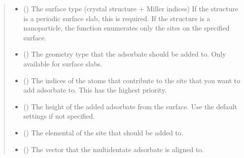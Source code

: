 \documentclass[letterpaper,10pt,english]{sphinxmanual}
\begin{document}
\begin{fulllineitems}
\begin{quote}
\begin{description}
\begin{itemize}
\item {} 
 (\sphinxstyleliteralemphasis{\sphinxupquote{, }}) \textendash{} The surface type (crystal structure + Miller indices)
If the structure is a periodic surface slab, this is required.
If the structure is a nanoparticle, the function enumerates
only the sites on the specified surface.

\item {} 
 (\sphinxstyleliteralemphasis{\sphinxupquote{, }}) \textendash{} The geometry type that the adsorbate should be added to.
Only available for surface slabs.

\item {} 
 () \textendash{} The indices of the atoms that contribute to the site that
you want to add adsorbate to. This has the highest priority.

\item {} 
 (\sphinxstyleliteralemphasis{\sphinxupquote{, }}) \textendash{} The height of the added adsorbate from the surface.
Use the default settings if not specified.

\item {} 
 (\sphinxstyleliteralemphasis{\sphinxupquote{, }}) \textendash{} The elemental of the site that should be added to.

\item {} 
 (\sphinxstyleliteralemphasis{\sphinxupquote{, }}) \textendash{} The vector that the multidentate adsorbate is aligned to.


\end{itemize}
\end{description}
\end{quote}
\end{fulllineitems}
\end{document}
